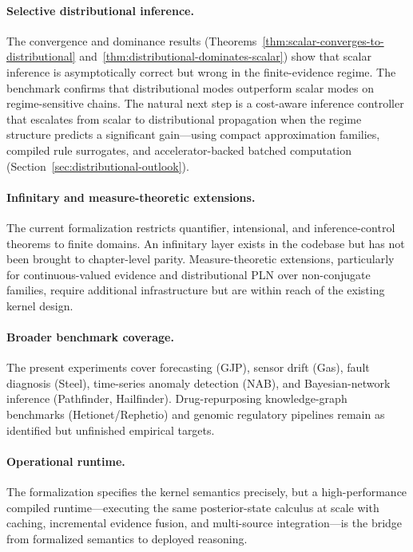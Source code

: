 \documentclass[11pt,openany]{report}
\begin{document}
\paragraph{Selective distributional inference.}
The convergence and dominance results
(Theorems~\ref{thm:scalar-converges-to-distributional}
and~\ref{thm:distributional-dominates-scalar}) show that scalar inference is
asymptotically correct but wrong in the finite-evidence regime.  The
benchmark confirms that distributional modes outperform scalar modes on
regime-sensitive chains.  The natural next step is a cost-aware inference
controller that escalates from scalar to distributional propagation when the
regime structure predicts a significant gain---using compact approximation
families, compiled rule surrogates, and accelerator-backed batched
computation (Section~\ref{sec:distributional-outlook}).

\paragraph{Infinitary and measure-theoretic extensions.}
The current formalization restricts quantifier, intensional, and
inference-control theorems to finite domains.  An infinitary layer exists in
the codebase but has not been brought to chapter-level parity.
Measure-theoretic extensions, particularly for continuous-valued evidence and
distributional PLN over non-conjugate families, require additional
infrastructure but are within reach of the existing kernel design.

\paragraph{Broader benchmark coverage.}
The present experiments cover forecasting (GJP), sensor drift (Gas),
fault diagnosis (Steel), time-series anomaly detection (NAB), and
Bayesian-network inference (Pathfinder, Hailfinder).  Drug-repurposing
knowledge-graph benchmarks (Hetionet/Rephetio) and genomic regulatory
pipelines remain as identified but unfinished empirical targets.

\paragraph{Operational runtime.}
The formalization specifies the kernel semantics precisely, but a
high-performance compiled runtime---executing the same posterior-state
calculus at scale with caching, incremental evidence fusion, and
multi-source integration---is the bridge from formalized semantics to
deployed reasoning.
\end{document}
